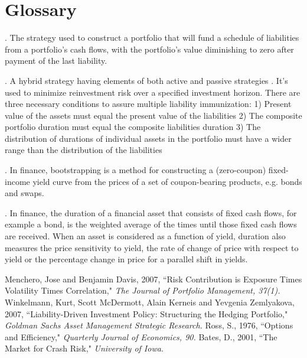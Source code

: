\documentclass[oneside,12pt]{report}
\begin{document}
\chapter{Glossary}\label{Glossary}

\vspace{12pt} 

\vspace{8pt}
. The strategy used to construct a portfolio that will fund a schedule of liabilities from a portfolio's cash flows, with the portfolio's value diminishing to zero after payment of the last liability. 

\vspace{8pt}
. A hybrid strategy having elements of both active and passive strategies . It's used to minimize reinvestment risk over a specified investment horizon.
There are three necessary conditions to assure multiple liability immunization:
1) Present value of the assets must equal the present value of the liabilities
2) The composite portfolio duration must equal the composite liabilities duration
3) The distribution of durations of individual assets in the portfolio must have a wider range than the distribution of the liabilities


\vspace{8pt}
. In finance, bootstrapping is a method for constructing a (zero-coupon) fixed-income yield curve from the prices of a set of coupon-bearing products, e.g. bonds and swaps.

\vspace{8pt} . In finance, the duration of a financial asset that consists of fixed cash flows, for example a bond, is the weighted average of the times until those fixed cash flows are received. When an asset is considered as a function of yield, duration also measures the price sensitivity to yield, the rate of change of price with respect to yield or the percentage change in price for a parallel shift in yields.






\newpage
\begin{thebibliography}{4}  
\bibitem{} Menchero, Jose and Benjamin Davis, 2007, ``Risk Contribution is Exposure Times Volatility Times Correlation," \emph{The Journal of Portfolio Management, 37(1).} 
\bibitem{}  Winkelmann, Kurt, Scott McDermott, Alain Kerneis and Yevgenia Zemlyakova, 2007, ``Liability-Driven Investment Policy: Structuring the Hedging Portfolio," \emph{Goldman Sachs Asset Management Strategic Research.}
\bibitem{}  Ross, S., 1976, ``Options and Efficiency," \emph{Quarterly Journal of Economics, 90.}
\bibitem{}  Bates, D., 2001, ``The Market for Crash Risk," \emph{University of Iowa.}
\end{thebibliography}



\renewcommand\bibname{Selected Bibliography Including Cited Works}
\nocite{*}  %

\end{document}
